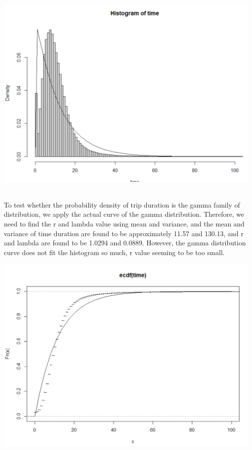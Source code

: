 \documentclass[11pt]{article}
\begin{document}
\includegraphics[scale = .5]{hist_p1_1.png}\\


\\
\par
To test whether the probability density of trip duration is the gamma family of distribution, we apply the actual
 curve of the gamma distribution. Therefore, we need to find the r and lambda value using mean and variance, and
 the mean and variance of time duration are found to be approximately 11.57 and 130.13, and r and lambda are found
 to be 1.0294 and 0.0889. However, the gamma distribution curve does not fit the histogram so much,  r value seeming
 to be too small. 


\includegraphics[scale = .50]{cdf_p1_1.png}
\end{document}
